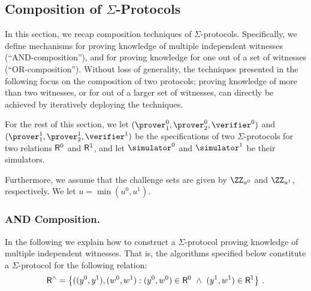 \documentclass[runningheads]{llncs}
\begin{document}
\subsection{Composition of $\Sigma$-Protocols}\label{sec:composition}
  In this section, we recap composition techniques of $\Sigma$-protocols.
  Specifically, we define mechanisms for proving knowledge of multiple independent witnesses (``AND-composition''), and for proving knowledge for one out of a set of witnesses (``OR-composition'').
  Without loss of generality, the techniques presented in the following focus on the composition of two protocols;
  proving knowledge of more than two witnesses, or for out of a larger set of witnesses, can directly be achieved by iteratively deploying the techniques.

  For the rest of this section, we let $(\prover_1^0,\prover_2^0,\verifier^0)$ and $(\prover_1^1,\prover_2^1,\verifier^1)$ be the specifications of two $\Sigma$-protocols for two relations $\mathsf{R}^0$ and $\mathsf{R}^1$, and let $\simulator^0$ and $\simulator^1$ be their simulators.

  Furthermore, we assume that the challenge sets are given by $\ZZ_{u^0}$ and $\ZZ_{u^1}$, respectively.
  We let $u=\min(u^0,u^1)$.


\subsubsection{AND Composition.}
  In the following we explain how to construct a $\Sigma$-protocol proving knowledge of multiple independent witnesses.
  That is, the algorithms specified below constitute a $\Sigma$-protocol for the following relation:
$$
  \mathsf{R}^\land = \left\{ ((y^0,y^1),(w^0,w^1) : (y^0,w^0)\in \mathsf{R}^0 ~\land~ (y^1,w^1)\in\mathsf{R}^1\right\}\,.
$$
\end{document}
